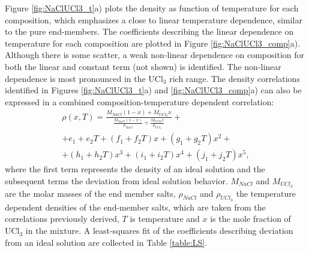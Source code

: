 \documentclass[preprint,3p,10pt,twocolumn,number,sort&compress]{elsarticle}
\begin{document}

Figure \ref{fig:NaClUCl3_t}a) plots the density as function of temperature for each composition, which emphasizes a close to linear temperature dependence, similar to the pure end-members. %
The coefficients describing the linear dependence on temperature for each composition are plotted in Figure \ref{fig:NaClUCl3_comp}a). Although there is some scatter, a weak non-linear dependence on composition for both the linear and constant term (not shown) is identified. The non-linear dependence is most pronounced in the UCl$_3$ rich range.  
The density correlations identified in Figures \ref{fig:NaClUCl3_t}a) and \ref{fig:NaClUCl3_comp}a) can also be expressed in a combined composition-temperature dependent correlation:
\begin{equation}
\begin{split}
\rho(x,T)=\frac{M_{NaCl}(1-x)+M_{UCl_3}x}{\frac{M_{NaCl}(1-x)}{\rho_{NaCl}} +\frac{M_{UCl3}x}{\rho_{UCl_3}}}+\\
+e_1+e_2T+(f_1+f_2T)x+(g_1+g_2T)x^2+\\
+(h_1+h_2T)x^3+(i_1+i_2T)x^4+(j_1+j_2T)x^5,
\label{eq:LS}
\end{split}
\end{equation}
where the first term represents the density of an ideal solution and the subsequent terms the deviation from ideal solution behavior. $M_{NaCl}$ and $M_{UCl_3}$ are the molar masses of the end member salts, $\rho_{NaCl}$ and $\rho_{UCl_3}$ the temperature dependent densities of the end-member salts, which are taken from the correlations previously derived, $T$ is temperature and $x$ is the mole fraction of UCl$_3$ in the mixture. A least-squares fit of the coefficients describing deviation from an ideal solution are collected in Table \ref{table:LS}.
\end{document}
